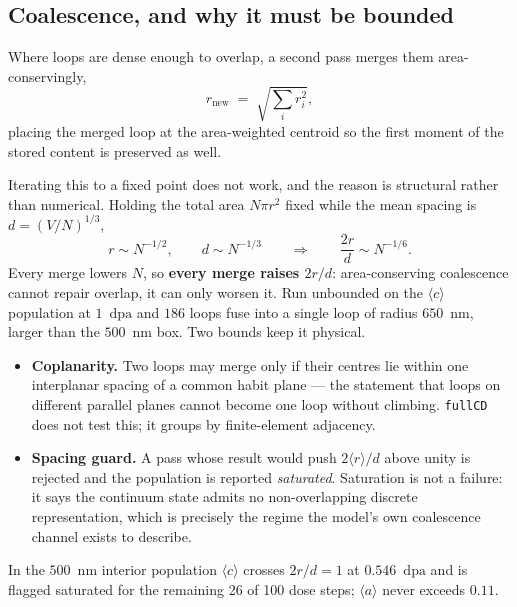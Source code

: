\documentclass[11pt,a4paper]{article}
\newcommand{\code}[1]{\texttt{\small #1}}
\newcommand{\dpa}{\ensuremath{\mathrm{dpa}}}
\newcommand{\aloop}{\ensuremath{\langle a\rangle}}
\newcommand{\cloop}{\ensuremath{\langle c\rangle}}
\begin{document}
\subsection{Coalescence, and why it must be bounded}

Where loops are dense enough to overlap, a second pass merges them
area-conservingly,
\begin{equation}
  r_{\text{new}} \;=\; \sqrt{\textstyle\sum_i r_i^{2}} ,
  \label{eq:merge}
\end{equation}
placing the merged loop at the area-weighted centroid so the first moment of the
stored content is preserved as well.

Iterating this to a fixed point does not work, and the reason is structural
rather than numerical. Holding the total area $N\pi r^{2}$ fixed while the mean
spacing is $d=(V/N)^{1/3}$,
\begin{equation}
  r \sim N^{-1/2}, \qquad d \sim N^{-1/3}
  \qquad\Longrightarrow\qquad
  \frac{2r}{d} \sim N^{-1/6} .
  \label{eq:percolation}
\end{equation}
Every merge lowers $N$, so \textbf{every merge raises $2r/d$}: area-conserving
coalescence cannot repair overlap, it can only worsen it. Run unbounded on the
\cloop{} population at $1$~\dpa{} and $186$ loops fuse into a single loop of
radius $650$~nm, larger than the $500$~nm box. Two bounds keep it physical.

\begin{itemize}
\item \textbf{Coplanarity.} Two loops may merge only if their centres lie within
      one interplanar spacing of a common habit plane --- the statement that
      loops on different parallel planes cannot become one loop without
      climbing. \code{fullCD} does not test this; it groups by finite-element
      adjacency.
\item \textbf{Spacing guard.} A pass whose result would push $2\langle
      r\rangle/d$ above unity is rejected and the population is reported
      \emph{saturated}. Saturation is not a failure: it says the continuum state
      admits no non-overlapping discrete representation, which is precisely the
      regime the model's own coalescence channel exists to describe.
\end{itemize}

In the $500$~nm interior population \cloop{} crosses $2r/d=1$ at
$0.546$~\dpa{} and is flagged saturated for the remaining 26 of 100 dose steps;
\aloop{} never exceeds $0.11$.
\end{document}
